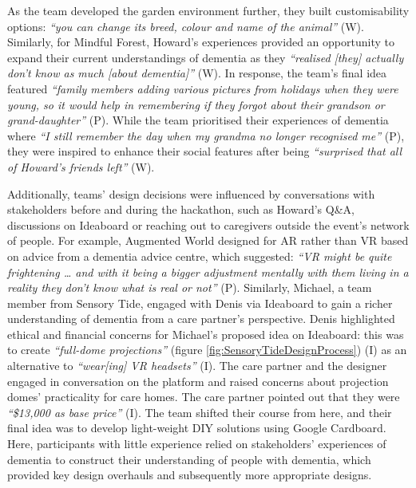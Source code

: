As the team developed the garden environment further, they built customisability options: \textit{``you can change its breed, colour and name of the animal''} (W). Similarly, for Mindful Forest, Howard’s experiences provided an opportunity to expand their current understandings of dementia as they \textit{``realised [they] actually don’t know as much [about dementia]''} (W). In response, the team’s final idea featured \textit{``family members adding various pictures from holidays when they were young, so it would help in remembering if they forgot about their grandson or grand-daughter''} (P). While the team prioritised their experiences of dementia where \textit{``I still remember the day when my grandma no longer recognised me''} (P), they were inspired to enhance their social features after being \textit{``surprised that all of Howard’s friends left''} (W). 

Additionally, teams’ design decisions were influenced by conversations with stakeholders before and during the hackathon, such as Howard’s Q\&A, discussions on Ideaboard or reaching out to caregivers outside the event’s network of people. For example, Augmented World designed for AR rather than VR based on advice from a dementia advice centre, which suggested: \textit{``VR might be quite frightening … and with it being a bigger adjustment mentally with them living in a reality they don’t know what is real or not''} (P). Similarly, Michael, a team member from Sensory Tide, engaged with Denis via Ideaboard to gain a richer understanding of dementia from a care partner’s perspective. Denis highlighted ethical and financial concerns for Michael’s proposed idea on Ideaboard: this was to create \textit{``full-dome projections''} (figure \ref{fig:SensoryTideDesignProcess}) (I) as an alternative to \textit{``wear[ing] VR headsets''} (I). The care partner and the designer engaged in conversation on the platform and raised concerns about projection domes’ practicality for care homes. The care partner pointed out that they were \textit{``\$13,000 as base price''} (I). The team shifted their course from here, and their final idea was to develop light-weight DIY solutions using Google Cardboard. Here, participants with little experience relied on stakeholders' experiences of dementia to construct their understanding of people with dementia, which provided key design overhauls and subsequently more appropriate designs.

